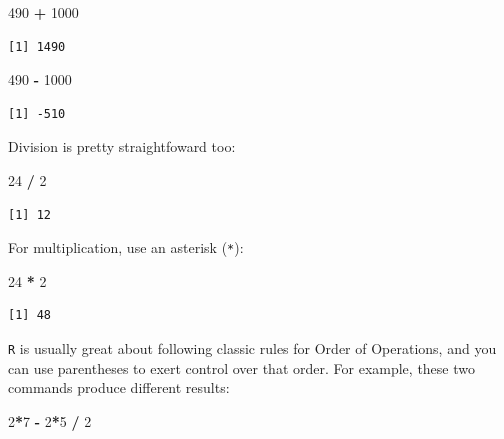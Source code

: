 \documentclass[
]{book}
\newenvironment{Shaded}{\begin{snugshade}}{\end{snugshade}}
\newcommand{\DecValTok}[1]{\textcolor[rgb]{0.00,0.00,0.81}{#1}}
\newcommand{\OperatorTok}[1]{\textcolor[rgb]{0.81,0.36,0.00}{\textbf{#1}}}
\newcommand{\StringTok}[1]{\textcolor[rgb]{0.31,0.60,0.02}{#1}}
\begin{document}
\begin{Shaded}
\begin{Highlighting}[]
\DecValTok{490} \OperatorTok{+}\StringTok{ }\DecValTok{1000}
\end{Highlighting}
\end{Shaded}

\begin{verbatim}
[1] 1490
\end{verbatim}

\begin{Shaded}
\begin{Highlighting}[]
\DecValTok{490} \OperatorTok{-}\StringTok{ }\DecValTok{1000}
\end{Highlighting}
\end{Shaded}

\begin{verbatim}
[1] -510
\end{verbatim}

Division is pretty straightfoward too:

\begin{Shaded}
\begin{Highlighting}[]
\DecValTok{24} \OperatorTok{/}\StringTok{ }\DecValTok{2}
\end{Highlighting}
\end{Shaded}

\begin{verbatim}
[1] 12
\end{verbatim}

For multiplication, use an asterisk (\texttt{*}):

\begin{Shaded}
\begin{Highlighting}[]
\DecValTok{24} \OperatorTok{*}\StringTok{ }\DecValTok{2}
\end{Highlighting}
\end{Shaded}

\begin{verbatim}
[1] 48
\end{verbatim}

\texttt{R} is usually great about following classic rules for Order of Operations, and you can use parentheses to exert control over that order. For example, these two commands produce different results:

\begin{Shaded}
\begin{Highlighting}[]
\DecValTok{2}\OperatorTok{*}\DecValTok{7} \OperatorTok{-}\StringTok{ }\DecValTok{2}\OperatorTok{*}\DecValTok{5} \OperatorTok{/}\StringTok{ }\DecValTok{2}
\end{Highlighting}
\end{Shaded}
\end{document}

